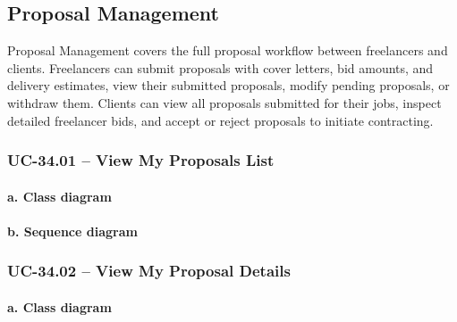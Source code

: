 

\subsection{Proposal Management}

Proposal Management covers the full proposal workflow between freelancers and clients. Freelancers can submit proposals with cover letters, bid amounts, and delivery estimates, view their submitted proposals, modify pending proposals, or withdraw them. Clients can view all proposals submitted for their jobs, inspect detailed freelancer bids, and accept or reject proposals to initiate contracting.

\subsubsection{UC-34.01 -- View My Proposals List}

\paragraph*{a. Class diagram}

\paragraph*{b. Sequence diagram}

\subsubsection{UC-34.02 -- View My Proposal Details}

\paragraph*{a. Class diagram}

